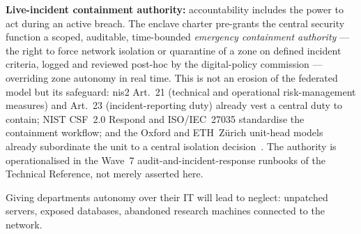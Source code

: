 \begin{answerbox}[Answer to Q2.1]
\medskip\noindent\textbf{Live-incident containment authority:} accountability includes the power to act during an active breach. The enclave charter pre-grants the central security function a scoped, auditable, time-bounded \emph{emergency containment authority} --- the right to force network isolation or quarantine of a zone on defined incident criteria, logged and reviewed post-hoc by the digital-policy commission --- overriding zone autonomy in real time. This is not an erosion of the federated model but its safeguard: \gls{nis2} Art.~21 (technical and operational risk-management measures) and Art.~23 (incident-reporting duty) already vest a central duty to contain; NIST CSF~2.0 Respond and ISO/IEC~27035 standardise the containment workflow; and the Oxford and ETH~Z\"urich unit-head models already subordinate the unit to a central isolation decision~\cite{oxford-infosec,eth-baseline}. The authority is operationalised in the Wave~7 audit-and-incident-response runbooks of the Technical Reference, not merely asserted here.
\end{answerbox}

\bigskip

\begin{questionbox}
Giving departments autonomy over their IT will lead to neglect: unpatched servers, exposed databases, abandoned research machines connected to the network.
\end{questionbox}

